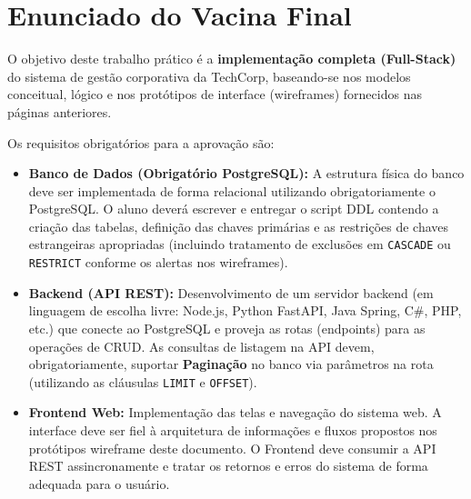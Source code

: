 \documentclass[12pt,a4paper]{article}
\begin{document}
\vspace{0.4cm}
\section*{Enunciado do Vacina Final}

O objetivo deste trabalho prático é a \textbf{implementação completa (Full-Stack)} do sistema de gestão corporativa da TechCorp, baseando-se nos modelos conceitual, lógico e nos protótipos de interface (wireframes) fornecidos nas páginas anteriores. 

Os requisitos obrigatórios para a aprovação são:
\begin{itemize}[leftmargin=*, noitemsep]
    \item \textbf{Banco de Dados (Obrigatório PostgreSQL):} A estrutura física do banco deve ser implementada de forma relacional utilizando obrigatoriamente o PostgreSQL. O aluno deverá escrever e entregar o script DDL contendo a criação das tabelas, definição das chaves primárias e as restrições de chaves estrangeiras apropriadas (incluindo tratamento de exclusões em \texttt{CASCADE} ou \texttt{RESTRICT} conforme os alertas nos wireframes).
    \item \textbf{Backend (API REST):} Desenvolvimento de um servidor backend (em linguagem de escolha livre: Node.js, Python FastAPI, Java Spring, C\#, PHP, etc.) que conecte ao PostgreSQL e proveja as rotas (endpoints) para as operações de CRUD. As consultas de listagem na API devem, obrigatoriamente, suportar \textbf{Paginação} no banco via parâmetros na rota (utilizando as cláusulas \texttt{LIMIT} e \texttt{OFFSET}).
    \item \textbf{Frontend Web:} Implementação das telas e navegação do sistema web. A interface deve ser fiel à arquitetura de informações e fluxos propostos nos protótipos wireframe deste documento. O Frontend deve consumir a API REST assincronamente e tratar os retornos e erros do sistema de forma adequada para o usuário.
\end{itemize}
\end{document}
